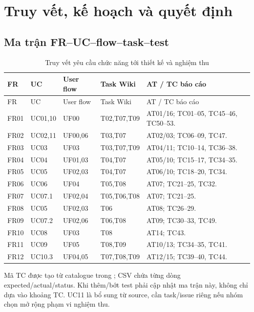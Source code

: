 \chapter{Truy vết, kế hoạch và quyết định}
\section{Ma trận FR--UC--flow--task--test}
\begin{smalltable}\begin{longtable}{L{1.3cm}L{2.1cm}L{2.1cm}L{2.2cm}L{6.8cm}}
\caption{Truy vết yêu cầu chức năng tới thiết kế và nghiệm thu}\label{tab:trace-fr}\\\toprule FR & UC & User flow & Task Wiki & AT / TC báo cáo\\\midrule\endfirsthead
\toprule FR & UC & User flow & Task Wiki & AT / TC báo cáo\\\midrule\endhead
FR01 & UC01,10 & UF00 & T02,T07,T09 & AT01/16; TC01--05, TC45--46, TC50--53.\\
FR02 & UC02,11 & UF00,06 & T03,T07 & AT02/03; TC06--09, TC47.\\
FR03 & UC03 & UF03 & T03,T07,T09 & AT04/11; TC10--14, TC36--38.\\
FR04 & UC04 & UF01,03 & T04,T07 & AT05/10; TC15--17, TC34--35.\\
FR05 & UC05 & UF02,03 & T04,T07 & AT06/10; TC18--20, TC34.\\
FR06 & UC06 & UF04 & T05,T08 & AT07; TC21--25, TC32.\\
FR07 & UC07.1 & UF02,04 & T05,T06,T08 & AT07; TC21--25.\\
FR08 & UC05 & UF02,03 & T06 & AT08; TC26--29.\\
FR09 & UC07.2 & UF02,06 & T06,T08 & AT09; TC30--33, TC49.\\
FR10 & UC08 & UF03 & T08 & AT14; TC43.\\
FR11 & UC09 & UF05 & T08,T09 & AT10/13; TC34--35, TC41.\\
FR12 & UC10.3 & UF04,05 & T07,T08,T09 & AT12/15; TC39--40, TC44.\\\bottomrule
\end{longtable}\end{smalltable}
Mã TC được tạo từ catalogue trong ; CSV chứa từng dòng expected/actual/status. Khi thêm/bớt test phải cập nhật ma trận này, không chỉ dựa vào khoảng TC. UC11 là bổ sung từ source, cần task/issue riêng nếu nhóm chọn mở rộng phạm vi nghiệm thu.
